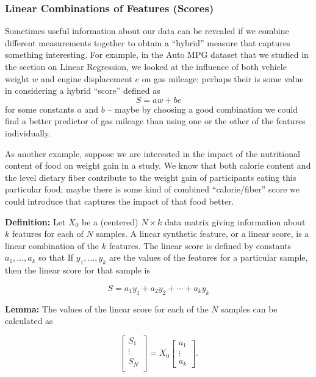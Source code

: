 \documentclass[
]{article}
\begin{document}
\hypertarget{linear-combinations-of-features-scores}{%
\subsubsection{Linear Combinations of Features
(Scores)}\label{linear-combinations-of-features-scores}}

Sometimes useful information about our data can be revealed if we
combine different measurements together to obtain a ``hybrid'' measure
that captures something interesting. For example, in the Auto MPG
dataset that we studied in the section on Linear Regression, we looked
at the influence of both vehicle weight \(w\) and engine displacement
\(e\) on gas mileage; perhaps their is some value in considering a
hybrid ``score'' defined as \[
S = aw + be
\] for some constants \(a\) and \(b\) -- maybe by choosing a good
combination we could find a better predictor of gas mileage than using
one or the other of the features individually.

As another example, suppose we are interested in the impact of the
nutritional content of food on weight gain in a study. We know that both
calorie content and the level dietary fiber contribute to the weight
gain of participants eating this particular food; maybe there is some
kind of combined ``calorie/fiber'' score we could introduce that
captures the impact of that food better.

\textbf{Definition:} Let \(X_{0}\) be a (centered) \(N\times k\) data
matrix giving information about \(k\) features for each of \(N\)
samples. A linear synthetic feature, or a linear score, is a linear
combination of the \(k\) features. The linear score is defined by
constants \(a_{1},\ldots, a_{k}\) so that If \(y_{1},\ldots, y_{k}\) are
the values of the features for a particular sample, then the linear
score for that sample is

\[
S = a_{1}y_{1}+a_{2}y_{2}+\cdots+a_{k}y_{k}
\]

\textbf{Lemma:} The values of the linear score for each of the \(N\)
samples can be calculated as

\begin{equation}
\left[\begin{matrix} S_{1} \\ \vdots \\ S_{N}\\ \end{matrix}\right] =
X_{0}\left[
\begin{matrix} a_{1} \\ \vdots \\ a_{k}\end{matrix}\right].
\label{eq:linearscore}\end{equation}
\end{document}
